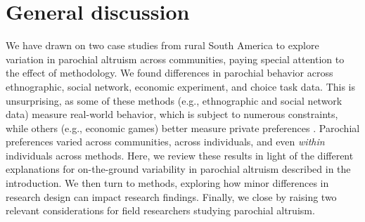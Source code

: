 \documentclass[bibauthoryear]{aa}
\begin{document}
\section{General discussion}

We have drawn on two case studies from rural South America to explore variation in parochial altruism across communities, paying special attention to the effect of methodology.  We found differences in parochial behavior across ethnographic, social network, economic experiment, and choice task data. This is unsurprising, as some of these methods (e.g., ethnographic and social network data) measure real-world behavior, which is subject to numerous constraints, while others (e.g.,  economic games) better measure private preferences \citep{Pisor2020}. Parochial preferences varied across communities, across individuals, and even \emph{within} individuals across methods. Here, we review these results in light of the different explanations for on-the-ground variability in parochial altruism described in the introduction. We then turn to methods, exploring how minor differences in research design can impact research findings. Finally, we close by raising two relevant considerations for field researchers studying parochial altruism.
\end{document}
